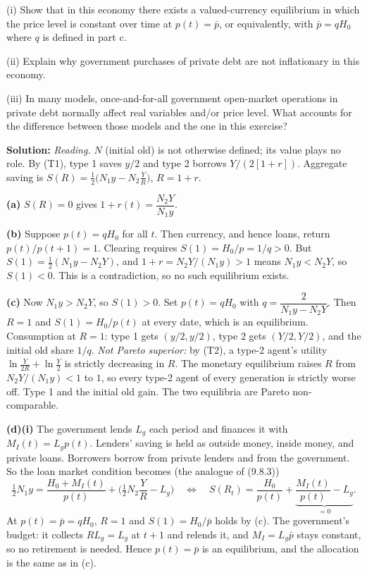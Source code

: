 \documentclass[12pt, letterpaper]{article}
\begin{document}
\begin{tcolorbox}[evenbox,title={Exercise 9.8 \quad Inside money and real bills}]
\begin{tcolorbox}[questionbox]
(i) Show that in this economy there exists a valued-currency equilibrium in which the price level is
constant over time at $p(t)=\bar p$, or equivalently, with $\bar p=qH_0$ where $q$ is defined in
part c.

(ii) Explain why government purchases of private debt are not inflationary in this economy.

(iii) In many models, once-and-for-all government open-market operations in private debt normally
affect real variables and/or price level. What accounts for the difference between those models and
the one in this exercise?
\end{tcolorbox}

\textbf{Solution:} \emph{Reading.} $N$ (initial old) is not otherwise defined; its value plays no
role. By (T1), type 1 saves $y/2$ and type 2 borrows $Y/(2[1+r])$. Aggregate saving is
$S(R)=\frac12\big(N_1y-N_2\frac YR\big)$, $R=1+r$.

\textbf{(a)} $S(R)=0$ gives $\boxed{1+r(t)=\dfrac{N_2Y}{N_1y}}$.

\textbf{(b)} Suppose $p(t)=qH_0$ for all $t$. Then currency, and hence loans, return
$p(t)/p(t+1)=1$. Clearing requires $S(1)=H_0/p=1/q>0$. But $S(1)=\frac12(N_1y-N_2Y)$, and
$1+r=N_2Y/(N_1y)>1$ means $N_1y<N_2Y$, so $S(1)<0$. This is a contradiction, so no such equilibrium
exists.

\textbf{(c)} Now $N_1y>N_2Y$, so $S(1)>0$. Set $p(t)=qH_0$ with
$\boxed{q=\dfrac{2}{N_1y-N_2Y}}$. Then $R=1$ and $S(1)=H_0/p(t)$ at every date, which is an
equilibrium. Consumption at $R=1$: type 1 gets $(y/2,y/2)$, type 2 gets $(Y/2,Y/2)$, and the initial
old share $1/q$. \emph{Not Pareto superior:} by (T2), a type-2 agent's utility
$\ln\frac Y{2R}+\ln\frac Y2$ is strictly decreasing in $R$. The monetary equilibrium raises $R$ from
$N_2Y/(N_1y)<1$ to $1$, so every type-2 agent of every generation is strictly worse off. Type 1 and
the initial old gain. The two equilibria are Pareto non-comparable.

\textbf{(d)(i)} The government lends $L_g$ each period and finances it with $M_I(t)=L_gp(t)$. Lenders'
saving is held as outside money, inside money, and private loans. Borrowers borrow from private
lenders and from the government. So the loan market condition becomes (the analogue of (9.8.3))
\[
\tfrac12N_1y=\frac{H_0+M_I(t)}{p(t)}+\Big(\tfrac12N_2\frac YR-L_g\Big)
\quad\Longleftrightarrow\quad S(R_t)=\frac{H_0}{p(t)}+\underbrace{\frac{M_I(t)}{p(t)}-L_g}_{=0}.
\]
At $p(t)=\bar p=qH_0$, $R=1$ and $S(1)=H_0/\bar p$ holds by (c). The government's budget: it collects
$RL_g=L_g$ at $t+1$ and relends it, and $M_I=L_g\bar p$ stays constant, so no retirement is needed.
Hence $p(t)=\bar p$ is an equilibrium, and the allocation is the same as in (c).


\end{tcolorbox}
\end{document}

